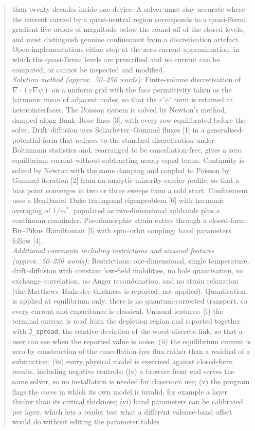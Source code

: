 \documentclass[preprint,12pt]{elsarticle}
\newcounter{bla}
\begin{document}
\begin{frontmatter}
\begin{abstract}
\begin{small}
than twenty decades inside one device. A solver must stay accurate where the
current carried by a quasi-neutral region corresponds to a quasi-Fermi
gradient five orders of magnitude below the round-off of the stored levels,
and must distinguish genuine confinement from a discretisation artefact. Open
implementations either stop at the zero-current approximation, in which the
quasi-Fermi levels are prescribed and no current can be computed, or cannot be
inspected and modified. \\
{\em Solution method (approx.\ 50--250 words):}
Finite-volume discretisation of $\nabla\!\cdot(\varepsilon\nabla\psi)$ on a
uniform grid with the face permittivity taken as the harmonic mean of adjacent
nodes, so that the $\varepsilon'\psi'$ term is retained at heterointerfaces.
The Poisson system is solved by Newton's method, damped along Bank--Rose
lines [3], with every row equilibrated before the solve. Drift--diffusion uses Scharfetter--Gummel fluxes [1] in a
generalised-potential form that reduces to the standard discretisation under
Boltzmann statistics and, rearranged to be cancellation-free, gives a
zero equilibrium current without subtracting nearly equal terms.
Continuity is solved by Newton with the same damping and coupled to Poisson by
Gummel iteration [2] from an analytic minority-carrier profile, so that a bias
point converges in two or three sweeps from a cold start. Confinement uses a
BenDaniel--Duke tridiagonal eigenproblem [6] with harmonic averaging of $1/m^{*}$,
populated as two-dimensional subbands plus a continuum remainder. Pseudomorphic
strain enters through a closed-form Bir--Pikus Hamiltonian [5] with spin--orbit
coupling; band parameters follow [4]. \\
{\em Additional comments including restrictions and unusual features
(approx.\ 50--250 words):}
Restrictions: one-dimensional, single temperature, drift--diffusion with
constant low-field mobilities, no hole quantisation, no exchange--correlation,
no Auger recombination, and no strain relaxation (the Matthews--Blakeslee
thickness is reported, not applied). Quantisation is applied at equilibrium
only: there is no quantum-corrected transport, so every current and
capacitance is classical. Unusual features: (i) the terminal
current is read from the depletion region and reported together with
\texttt{J\_spread}, the relative deviation of the worst discrete link, so that
a user can see when the reported value is noise;
(ii) the equilibrium current is zero by construction of the
cancellation-free flux rather than a residual of a subtraction;
(iii) every physical model is exercised against closed-form results, including
negative controls; (iv) a browser front end serves the same solver, so no
installation is needed for classroom use; (v) the program flags the cases in which its own model is invalid, for example a
layer thicker than its critical thickness; (vi) band parameters can be
calibrated per layer, which lets a reader test what a different valence-band
offset would do without editing the parameter tables.


\end{small}
\end{abstract}
\end{frontmatter}
\end{document}
